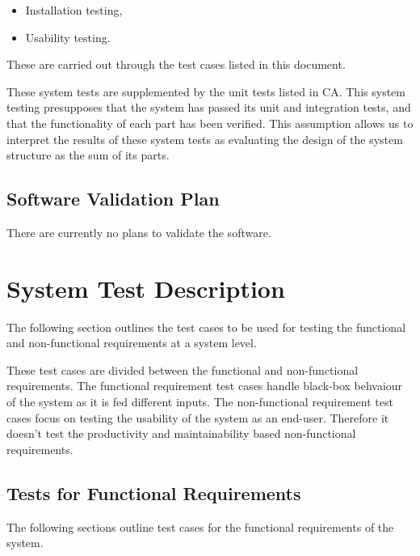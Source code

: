 \documentclass[12pt, titlepage]{article}
\begin{document}
\begin{itemize}
	\item Installation testing,
	\item Usability testing.
\end{itemize}

These are carried out through the test cases listed in this document.

These system tests are supplemented by the unit tests listed in CA. 
This system testing presupposes that the system has passed its unit and 
integration tests, and that the functionality of each part has been verified. 
This assumption allows us to interpret the results of these system tests as 
evaluating the design of the system structure as the sum of its parts.


\subsection{Software Validation Plan}
There are currently no plans to validate the software.  

\section{System Test Description}
The following section outlines the test cases to be used for testing the 
functional and non-functional requirements at a system level.

These test cases are divided between the functional and non-functional 
requirements. The functional requirement test cases handle black-box behvaiour
of the system as it is fed different inputs. The non-functional requirement 
test cases focus on testing the usability of the system as an end-user. 
Therefore it doesn't test the productivity and maintainability based 
non-functional requirements.

\subsection{Tests for Functional Requirements}
The following sections outline test cases for the functional requirements of 
the system.
\end{document}
